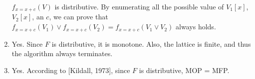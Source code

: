 \documentclass[11pt]{report}
\begin{document}
\begin{enumerate}
  $f_{x=x+c}(V)$ is distributive. By enumerating all the possible value of $V_1[x]$, $V_2[x]$, an $c$, we can prove that $f_{x=x+c}(V_1) \vee f_{x=x+c}(V_2) = f_{x=x+c}(V_1 \vee V_2)$ always holds.
  \item Yes. Since $F$ is distributive, it is monotone. Also, the lattice is finite, and thus the algorithm always terminates.
  \item Yes. According to [Kildall, 1973], since $F$ is distributive, MOP = MFP.
\end{enumerate}
\end{document}
